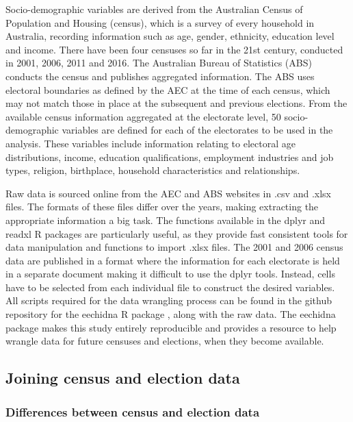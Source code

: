 \documentclass[
  times, doublespace]{anzsauth}
\begin{document}
Socio-demographic variables are derived from the Australian Census of Population and Housing (census), which is a survey of every household in Australia, recording information such as age, gender, ethnicity, education level and income. There have been four censuses so far in the 21st century, conducted in 2001, 2006, 2011 and 2016. The Australian Bureau of Statistics (ABS) conducts the census and publishes aggregated information. The ABS uses electoral boundaries as defined by the AEC at the time of each census, which may not match those in place at the subsequent and previous elections. From the available census information aggregated at the electorate level, 50 socio-demographic variables are defined for each of the electorates to be used in the analysis. These variables include information relating to electoral age distributions, income, education qualifications, employment industries and job types, religion, birthplace, household characteristics and relationships.

Raw data is sourced online from the AEC and ABS websites in \textsf{.csv} and \textsf{.xlsx} files. The formats of these files differ over the years, making extracting the appropriate information a big task. The functions available in the \textsf{dplyr} \citep{dplyr} and \textsf{readxl} \citep{readxl} \textsf{R} packages are particularly useful, as they provide fast consistent tools for data manipulation and functions to import \textsf{.xlsx} files. The 2001 and 2006 census data are published in a format where the information for each electorate is held in a separate document making it difficult to use the \textsf{dplyr} tools. Instead, cells have to be selected from each individual file to construct the desired variables. All scripts required for the data wrangling process can be found in the github repository for the \textsf{eechidna} \textsf{R} package \citep{eechidna}, along with the raw data. The \textsf{eechidna} package makes this study entirely reproducible and provides a resource to help wrangle data for future censuses and elections, when they become available.

\hypertarget{joining-census-and-election-data}{%
\subsection{Joining census and election data}\label{joining-census-and-election-data}}

\hypertarget{differences-between-census-and-election-data}{%
\subsubsection*{Differences between census and election data}\label{differences-between-census-and-election-data}}
\end{document}
